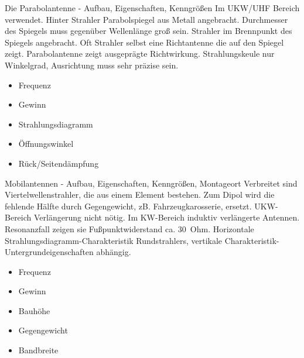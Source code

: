 \documentclass[avery5371,grid,frame,a4paper]{flashcards}
\newcommand{\card}[3]{
  \begin{flashcard}[{\chap} -- #1]{#2}#3\end{flashcard}
}
\begin{document}
\card{36}{Die Parabolantenne - Aufbau, Eigenschaften, Kenngrößen}{
  \small
  Im UKW/UHF Bereich verwendet.
  Hinter Strahler Parabolspiegel aus Metall angebracht. Durchmesser des Spiegels muss gegenüber Wellenlänge groß sein. Strahler im Brennpunkt des Spiegels angebracht. Oft Strahler selbst eine Richtantenne die auf den Spiegel zeigt. Parabolantenne zeigt ausgeprägte Richtwirkung. Strahlungskeule nur Winkelgrad, Ausrichtung muss sehr präzise sein.

  \vspace{5pt}
  \begin{minipage}{0.5\textwidth}
    \begin{itemize}
      \item Frequenz 
      \item Gewinn 
      \item Strahlungsdiagramm 
    \end{itemize}
  \end{minipage}
  \begin{minipage}{0.49\textwidth}
    \begin{itemize}
      \item Öffnungswinkel 
      \item {\footnotesize Rück/Seitendämpfung}
    \end{itemize}
  \end{minipage}
}
\card{37}{Mobilantennen - Aufbau, Eigenschaften, Kenngrößen, Montageort}{
  \small
  Verbreitet sind Viertelwellenstrahler, die aus einem Element bestehen. Zum Dipol wird die fehlende Hälfte durch Gegengewicht, zB. Fahrzeugkarosserie, ersetzt. UKW-Bereich Verlängerung nicht nötig. Im KW-Bereich induktiv verlängerte Antennen. Resonanzfall zeigen sie Fußpunktwiderstand ca. 30~Ohm. Horizontale Strahlungsdiagramm-Charakteristik Rundstrahlers, vertikale Charakteristik-Untergrundeigenschaften abhängig.

  \begin{minipage}{0.45\textwidth}
    \begin{itemize}
      \item Frequenz
      \item Gewinn
      \item Bauhöhe
    \end{itemize}
  \end{minipage}
  \begin{minipage}{0.5\textwidth}
    \begin{itemize}
      \item Gegengewicht
      \item Bandbreite
    \end{itemize}
  \end{minipage}
}
\end{document}
